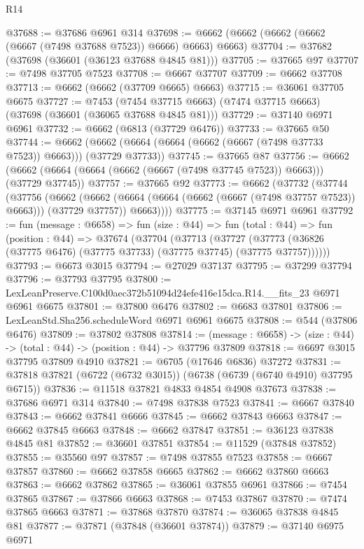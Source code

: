 \begin{lexlean}{R14}
\begin{coremodule}
@37688 := @37686 @6961 @314
@37698 := @6662 (@6662 (@6662 (@6662 (@6667 (@7498 @37688 @7523)) @6666) @6663) @6663)
@37704 := @37682 (@37698 (@36601 (@36123 @37688 @4845 @81)))
@37705 := @37665 @97
@37707 := @7498 @37705 @7523
@37708 := @6667 @37707
@37709 := @6662 @37708
@37713 := @6662 (@6662 (@37709 @6665) @6663)
@37715 := @36061 @37705 @6675
@37727 := @7453
    (@7454 @37715 @6663)
    (@7474 @37715 @6663)
    (@37698 (@36601 (@36065 @37688 @4845 @81)))
@37729 := @37140 @6971 @6961
@37732 := @6662 (@6813 (@37729 @6476))
@37733 := @37665 @50
@37744 := @6662 (@6662 (@6664 (@6664 (@6662 (@6667 (@7498 @37733 @7523)) @6663))) (@37729 @37733))
@37745 := @37665 @87
@37756 := @6662 (@6662 (@6664 (@6664 (@6662 (@6667 (@7498 @37745 @7523)) @6663))) (@37729 @37745))
@37757 := @37665 @92
@37773 := @6662
    (@37732
      (@37744
        (@37756
          (@6662
            (@6662 (@6664 (@6664 (@6662 (@6667 (@7498 @37757 @7523)) @6663))) (@37729 @37757))
            @6663))))
@37775 := @37145 @6971 @6961
@37792 := fun (message : @6658) =>
  fun (size : @44) =>
  fun (total : @44) =>
  fun (position : @44) =>
  @37674
    (@37704
      (@37713
        (@37727 (@37773 (@36826 (@37775 @6476) (@37775 @37733) (@37775 @37745) (@37775 @37757))))))
@37793 := @6673 @3015
@37794 := @27029 @37137
@37795 := @37299 @37794
@37796 := @37793 @37795
@37800 := LexLeanPreserve.C100d0aec372b51094d24efe416e15dca.R14.__fits_23 @6971 @6961 @6675
@37801 := @37800 @6476
@37802 := @6683 @37801
@37806 := LexLeanStd.Sha256.scheduleWord @6971 @6961 @6675
@37808 := @544 (@37806 @6476)
@37809 := @37802 @37808
@37814 := (message : @6658) -> (size : @44) -> (total : @44) -> (position : @44) -> @37796 @37809
@37818 := @6697 @3015 @37795 @37809 @4910
@37821 := @6705 (@17646 @6836) @37272
@37831 := @37818 @37821 (@6722 (@6732 @3015)) (@6738 (@6739 (@6740 @4910) @37795 @6715))
@37836 := @11518 @37821 @4833 @4854 @4908 @37673
@37838 := @37686 @6971 @314
@37840 := @7498 @37838 @7523
@37841 := @6667 @37840
@37843 := @6662 @37841 @6666
@37845 := @6662 @37843 @6663
@37847 := @6662 @37845 @6663
@37848 := @6662 @37847
@37851 := @36123 @37838 @4845 @81
@37852 := @36601 @37851
@37854 := @11529 (@37848 @37852)
@37855 := @35560 @97
@37857 := @7498 @37855 @7523
@37858 := @6667 @37857
@37860 := @6662 @37858 @6665
@37862 := @6662 @37860 @6663
@37863 := @6662 @37862
@37865 := @36061 @37855 @6961
@37866 := @7454 @37865
@37867 := @37866 @6663
@37868 := @7453 @37867
@37870 := @7474 @37865 @6663
@37871 := @37868 @37870
@37874 := @36065 @37838 @4845 @81
@37877 := @37871 (@37848 (@36601 @37874))
@37879 := @37140 @6975 @6971

\end{coremodule}
\end{lexlean}
